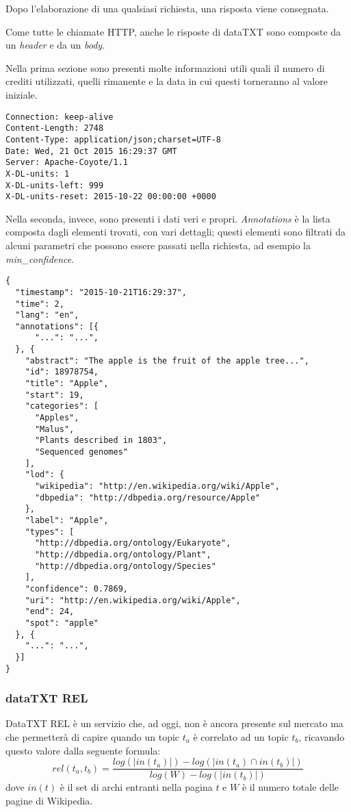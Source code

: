 		Dopo l'elaborazione di una qualsiasi richiesta, una risposta viene consegnata.

		Come  tutte le chiamate HTTP, anche le risposte di dataTXT sono composte da un \emph{header} e da un \emph{body}.

		Nella prima sezione sono presenti molte informazioni utili quali il numero di crediti utilizzati, quelli rimanente e la data in cui questi torneranno al valore iniziale.
		
		\begin{lstlisting}
Connection: keep-alive
Content-Length: 2748
Content-Type: application/json;charset=UTF-8
Date: Wed, 21 Oct 2015 16:29:37 GMT
Server: Apache-Coyote/1.1
X-DL-units: 1
X-DL-units-left: 999
X-DL-units-reset: 2015-10-22 00:00:00 +0000
		\end{lstlisting}

		Nella seconda, invece, sono presenti i dati veri e propri. \emph{Annotations} è la lista composta dagli elementi trovati, con vari dettagli; questi elementi sono filtrati da alcuni parametri che possono essere passati nella richiesta,  ad esempio la \emph{min\_confidence}.

		\begin{lstlisting}
{
  "timestamp": "2015-10-21T16:29:37",
  "time": 2,
  "lang": "en",
  "annotations": [{
      "...": "...",
  }, {
    "abstract": "The apple is the fruit of the apple tree...",
    "id": 18978754,
    "title": "Apple",
    "start": 19,
    "categories": [
      "Apples",
      "Malus",
      "Plants described in 1803",
      "Sequenced genomes"
    ],
    "lod": {
      "wikipedia": "http://en.wikipedia.org/wiki/Apple",
      "dbpedia": "http://dbpedia.org/resource/Apple"
    },
    "label": "Apple",
    "types": [
      "http://dbpedia.org/ontology/Eukaryote",
      "http://dbpedia.org/ontology/Plant",
      "http://dbpedia.org/ontology/Species"
    ],
    "confidence": 0.7869,
    "uri": "http://en.wikipedia.org/wiki/Apple",
    "end": 24,
    "spot": "apple"
  }, {
    "...": "...",
  }]
}
		\end{lstlisting}

	\subsubsection{dataTXT REL}
		DataTXT REL  è un servizio che, ad oggi, non è ancora presente sul mercato ma che permetterà di capire quando un topic $t_a$ è correlato ad un topic $t_b$, ricavando questo valore dalla seguente formula:
		\begin{equation*}
			rel(t_a, t_b) = \frac{log(| in(t_a) |) - log(| in(t_a) \cap in(t_b)|)}{log(W) - log(|in(t_b)|)}
		\end{equation*}
		dove $in(t)$ è il set di archi entranti nella pagina $t$ e $W$ è il numero totale delle pagine di Wikipedia\cite{datatxt_graph}.

